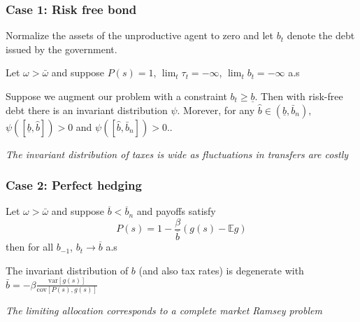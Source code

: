 \documentclass{beamer}
\newcommand{\var}{\mathrm{var}}
\newcommand{\cov}{\mathrm{cov}}
\begin{document}
\begin{frame}
 \frametitle{Case 1: Risk free bond}
 Normalize the assets of the unproductive agent to zero and let $b_t$ denote the debt issued by the government.
\begin{theorem}
Let $\omega>\bar{\omega}$ and  suppose $P(s)=1$, $\lim_t \tau_t=-\infty$, $\lim_t b_t=-\infty$     a.s
\end{theorem}

\vspace{3mm}

\begin{corollary} Suppose we augment our problem with a constraint $b_{t}\geq \underline{b}.$ Then with risk-free debt there is an invariant distribution $\psi .$ Morever, for any $\hat{b}\in \left( \underline{b},\bar{b}_n\right) ,$ $\psi \left( \left[ \underline{b},\hat{b}%
\right] \right) >0$ and $\psi \left( \left[ \hat{b},\bar{b}_n\right] \right)
>0.$. 
\end{corollary}


\vspace{3mm}
\emph{\color{red}The invariant distribution of taxes is wide as fluctuations in transfers are costly}

\end{frame}



\begin{frame}
 \frametitle{Case 2: Perfect hedging}
\begin{theorem}
Let $\omega>\bar{\omega}$ and suppose $\overline b < \overline b_n$ and payoffs satisfy
\[P(s) = 1- \frac{\beta}{\overline b}(g(s) - \mathbb{E} g)\] 
			 then for all $b_{-1}$, $b_t\rightarrow \overline b $ a.s 
\end{theorem}


\begin{corollary} The invariant distribution of $b$ (and also tax rates) is degenerate with $\bar{b}=-\beta\frac{\var[g(s)]}{\cov[P(s),g(s)]}$ 
\end{corollary}

\vspace{3mm}

\emph{\color{red} The limiting allocation corresponds to a complete market Ramsey problem}
\end{frame}
\end{document}
